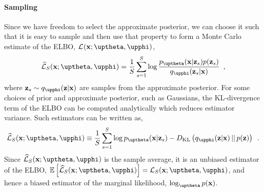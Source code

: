 \paragraph{Sampling}
Since we have freedom to select the approximate posterior, we can choose it such that it is easy to sample and then use that property to form a Monte Carlo estimate of the ELBO, $\mathcal{L}_{}(\xb;\thetab,\phib)$,
% 
\begin{equation} \label{eq:variational-autoencoder-elbo-sampling-expanded}
    \widehat{\mathcal{L}}_{S}(\xb;\thetab,\phib)
    =
    \frac{1}{S} \sum_{s=1}^{S} \log \frac{p_\thetab(\xb|\zb_{s}) p(\zb_{s})}{q_\phib(\zb_{s}|\xb)} \enspace , 
\end{equation}
%
where $\zb_{s} \sim q_\phib(\zb|\xb)$ are samples from the approximate posterior. 
For some choices of prior and approximate posterior, such as Gaussians, the KL-divergence term of the ELBO can be computed analytically which reduces estimator variance. 
Such estimators can be written as,
%
\begin{equation} \label{eq:variational-autoencoder-elbo-sampling-KL}
    \widehat{\mathcal{L}}_{S}(\xb;\thetab,\phib)
    \equiv
    \frac{1}{S} \sum_{s=1}^{S} \log p_\thetab(\xb|\zb_{s}) - D_\text{KL}\left( q_\phib(\zb|\xb) \,||\, p(\zb) \right)\enspace .
\end{equation}
%
Since $\widehat{\mathcal{L}}_{S}(\xb;\thetab,\phib)$ is the sample average, it is an unbiased estimator of the ELBO, $\mathbb{E}\left[\widehat{\mathcal{L}}_{S}(\xb;\thetab,\phib)\right] = \mathcal{L}_{S}(\xb;\thetab,\phib)$, and hence a biased estimator of the marginal likelihood, $\log_\thetab p(\xb)$.

